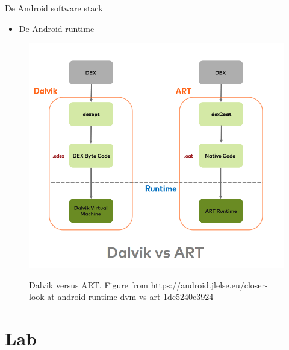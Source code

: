 \documentclass{beamer}
\begin{document}
\begin{frame}{De Android software stack }
\begin{itemize}	
	\item De Android runtime
\end{itemize}
\begin{figure}[ht]
	\centering
	\includegraphics[width=\textwidth]{img/hello/dalvikART.png}
	\label{fig:Dalvik versus ART}
	\caption{Dalvik versus ART. Figure from https://android.jlelse.eu/closer-look-at-android-runtime-dvm-vs-art-1dc5240c3924}
\end{figure}	
\end{frame}


\section{Lab}
\sectionframe{}
\end{document}
